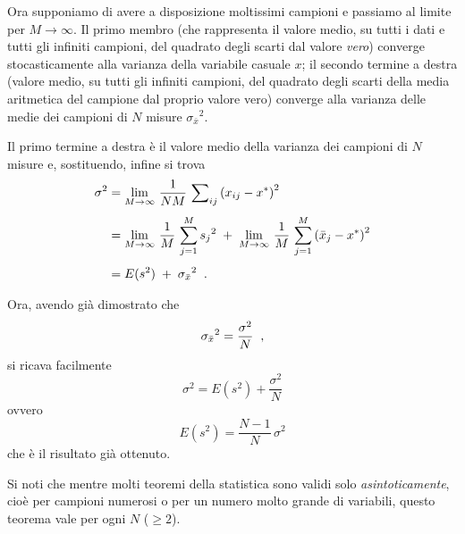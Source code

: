 Ora supponiamo di avere a disposizione moltissimi campioni e
passiamo al limite per $M \rightarrow \infty$.  Il primo
membro (che rappresenta il valore medio, su tutti i dati e
tutti gli infiniti campioni, del quadrato degli scarti dal
valore \emph{vero}) converge stocasticamente alla varianza
della variabile casuale $x$; il secondo termine a destra
(valore medio, su tutti gli infiniti campioni, del quadrato
degli scarti della media aritmetica del campione dal proprio
valore vero) converge alla varianza delle medie dei campioni
di $N$ misure ${\sigma_{\bar x}}^2$.

Il primo termine a destra \`e il valore medio della varianza
dei campioni di $N$ misure e, sostituendo, infine si trova
\begin{align*}
  \sigma ^{2} &= \lim_{M \rightarrow \infty} \,
    \frac{1}{NM} \, \sum \nolimits_{ij}
    \left( x_{ij} - x^{*} \right) ^{2} \\[1ex]
  &= \lim_{M \rightarrow \infty} \,
    \frac{1}{M} \, \sum_{j=1}^{M} {s_j}^2
    \; + \; \lim_{M \rightarrow \infty} \,
    \frac{1}{M} \, \sum_{j=1}^{M}
    \left( \bar x_{j} - x^{*} \right) ^{2} \\[1ex]
  &= E ( s^{2} ) \; + \; {\sigma_{\bar x}}^2 \;\; .
\end{align*}

Ora, avendo gi\`a dimostrato che
\begin{equation*}
  {\sigma_{\bar x}}^2 = \frac{\sigma^{2}}{N} \;\; ,
\end{equation*}
si ricava facilmente
\begin{equation*}
  \sigma^{2} = E ( s^{2} ) + \frac{\sigma^{2}}{N}
\end{equation*}
ovvero
\begin{equation*}
  E ( s^{2} ) = \frac{N-1}{N} \, \sigma^{2}
\end{equation*}
che \`e il risultato gi\`a ottenuto.

Si noti che mentre molti teoremi della statistica sono
validi solo \emph{asintoticamente}, cio\`e per campioni
numerosi o per un numero molto grande di variabili, questo
teorema vale per ogni $N$
($ \ge 2$).%

\endinput

